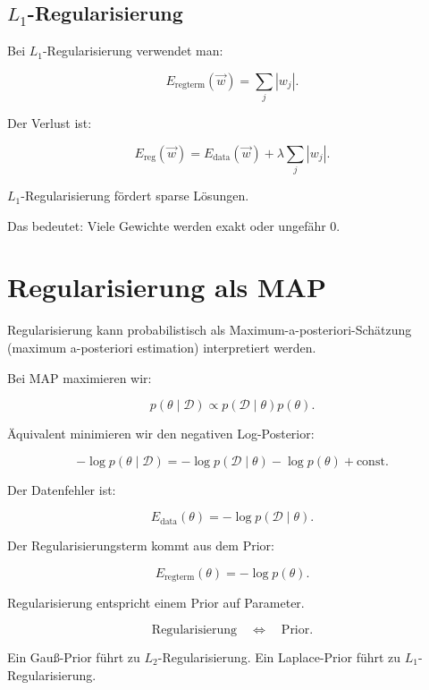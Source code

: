 \subsection{\(L_1\)-Regularisierung}

Bei \(L_1\)-Regularisierung verwendet man:

\[
    E_{\mathrm{regterm}}(\vec{w})
    =
    \sum_{j}
    |w_j|.
\]

Der Verlust ist:

\[
    E_{\mathrm{reg}}(\vec{w})
    =
    E_{\mathrm{data}}(\vec{w})
    +
    \lambda
    \sum_{j}
    |w_j|.
\]

\begin{conceptbox}
\(L_1\)-Regularisierung fördert sparse Lösungen.

Das bedeutet:
Viele Gewichte werden exakt oder ungefähr \(0\).
\end{conceptbox}

\section{Regularisierung als MAP}

Regularisierung kann probabilistisch als Maximum-a-posteriori-Schätzung (maximum a-posteriori estimation) interpretiert werden.

Bei MAP maximieren wir:

\[
    p(\theta\mid\mathcal{D})
    \propto
    p(\mathcal{D}\mid\theta)p(\theta).
\]

Äquivalent minimieren wir den negativen Log-Posterior:

\[
    -\log p(\theta\mid\mathcal{D})
    =
    -\log p(\mathcal{D}\mid\theta)
    -
    \log p(\theta)
    +
    \text{const}.
\]

Der Datenfehler ist:

\[
    E_{\mathrm{data}}(\theta)
    =
    -\log p(\mathcal{D}\mid\theta).
\]

Der Regularisierungsterm kommt aus dem Prior:

\[
    E_{\mathrm{regterm}}(\theta)
    =
    -\log p(\theta).
\]

\begin{conceptbox}
Regularisierung entspricht einem Prior auf Parameter.

\[
    \text{Regularisierung}
    \quad
    \Longleftrightarrow
    \quad
    \text{Prior}.
\]
\end{conceptbox}

Ein Gauß-Prior führt zu \(L_2\)-Regularisierung.
Ein Laplace-Prior führt zu \(L_1\)-Regularisierung.


